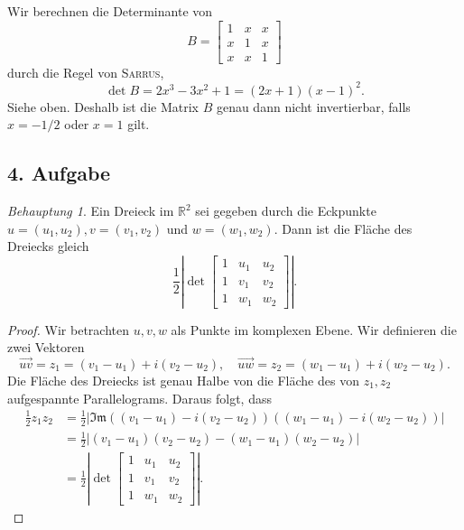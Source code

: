 \documentclass[fleqn,draft,a5paper]{article}
\providecommand{\abs}[1]{\left\lvert#1\right\rvert}
\theoremstyle{remark}
\newtheorem*{Behauptung}{Behauptung}
\begin{document}
Wir berechnen die Determinante von
\[
  B =
  \begin{bmatrix}
    1 & x & x  \\ x & 1 & x \\ x & x & 1
  \end{bmatrix}
\]
durch die Regel von \textsc{Sarrus},
\[\det B = 2x^{3} - 3x^{2} + 1 = (2x+1)(x-1)^{2}.\]
Siehe oben. Deshalb ist die Matrix \(B\) genau dann nicht invertierbar, falls \(x=-1/2\)
oder \(x=1\) gilt.

\subsection{4. Aufgabe}

\begin{Behauptung}
  Ein Dreieck im \(\mathbb{R}^{2}\) sei gegeben durch die Eckpunkte \(u = (u_{1},
  u_{2}), v = (v_{1}, v_{2})\) und \(w = (w_{1}, w_{2})\).  Dann ist die
  Fläche des Dreiecks gleich
  \[\frac{1}{2}\abs{\det
      \begin{bmatrix}
        1 & u_{1} & u_{2} \\ 1 & v_{1} & v_{2} \\ 1 & w_{1} & w_{2}
      \end{bmatrix}
    }.\]
\end{Behauptung}
\begin{proof}
  Wir betrachten \(u,v,w\) als Punkte im komplexen Ebene.  Wir
  definieren die zwei Vektoren
  \[\overrightarrow{uv}=z_{1}=(v_{1}-u_{1})+ i (v_{2}-u_{2}), \quad
    \overrightarrow{uw} = z_{2} = (w_{1}-u_{1})+i (w_{2}-u_{2}).\]
  Die Fläche des Dreiecks ist genau Halbe von die Fläche des von
  \(z_{1},z_{2}\) aufgespannte Parallelograms.  Daraus folgt, dass
  \begin{align*}
    \frac{1}{2}z_{1}z_{2}
    &= \frac{1}{2}\abs{\mathfrak{Im}((v_{1}-u_{1})-i(v_{2}-u_{2}))((w_{1}-u_{1})-i(w_{2}-u_{2}))}  \\
    &=
      \frac{1}{2}\abs{(v_{1}-u_{1})(v_{2}-u_{2})-(w_{1}-u_{1})(w_{2}-u_{2})}
    \\
    &=\frac{1}{2}\abs{\det
      \begin{bmatrix}
        1 & u_{1} & u_{2} \\ 1 & v_{1} & v_{2} \\ 1 & w_{1} & w_{2}
      \end{bmatrix}
    }.
  \end{align*}
\end{proof}
\end{document}
